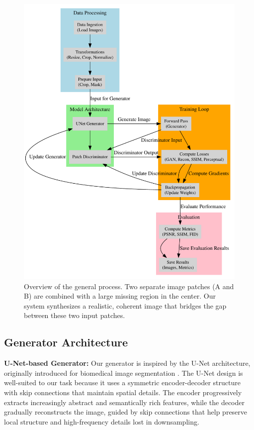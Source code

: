 \documentclass[sigconf]{acmart}
\begin{document}
\begin{figure}[h!]
    \centering
    \includegraphics[width=\linewidth]{general_process.pdf}
    \caption{Overview of the general process. Two separate image patches (A and B) are combined with a large missing region in the center. Our system synthesizes a realistic, coherent image that bridges the gap between these two input patches.}
    \label{fig:general_process}
\end{figure}

\subsection*{Generator Architecture}

\noindent\textbf{U-Net-based Generator:}  
Our generator is inspired by the U-Net architecture, originally introduced for biomedical image segmentation \cite{Ronneberger2015}. The U-Net design is well-suited to our task because it uses a symmetric encoder-decoder structure with skip connections that maintain spatial details. The encoder progressively extracts increasingly abstract and semantically rich features, while the decoder gradually reconstructs the image, guided by skip connections that help preserve local structure and high-frequency details lost in downsampling.
\end{document}
